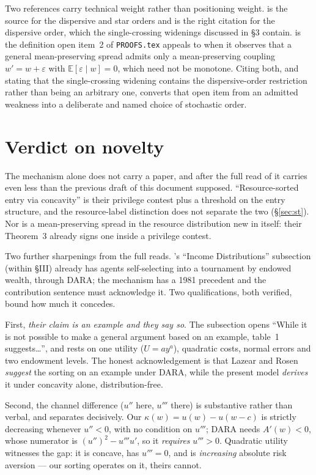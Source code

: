 \documentclass[11pt,a4paper]{article}
\begin{document}
Two references carry technical weight rather than positioning weight.
\citet{ShakedShanthikumar2007} is the source for the dispersive and star orders
and is the right citation for the dispersive order, which the single-crossing
widenings discussed in \S3 contain.
\citet{RothschildStiglitz1970} is the definition open item~2 of
\texttt{PROOFS.tex} appeals to when it observes that a general mean-preserving
spread admits only a mean-preserving coupling $w' = w + \varepsilon$ with
$\mathbb{E}[\varepsilon \mid w] = 0$, which need not be monotone. Citing both,
and stating that the single-crossing widening contains the dispersive-order
restriction rather than being an arbitrary one, converts that open item from an
admitted weakness into a deliberate and named choice of stochastic order.

\section{Verdict on novelty}

The mechanism alone does not carry a paper, and after the full read of
\citet{SchroyenTreich2016} it carries even less than the previous draft of this
document supposed. ``Resource-sorted entry via concavity'' is their privilege
contest plus a \citet{MorenoWooders2011} threshold on the entry structure, and
the resource-label distinction does not separate the two (\S\ref{sec:st}).
Nor is a mean-preserving spread in the resource distribution new in itself:
their Theorem~3 already signs one inside a privilege contest.

Two further sharpenings from the full reads. \citet{LazearRosen1981}'s
``Income Distributions'' subsection (within \S III) already has agents
self-selecting into a tournament by endowed wealth, through DARA; the mechanism
has a 1981 precedent and the contribution sentence must acknowledge it. Two
qualifications, both verified, bound how much it concedes.

First, \emph{their claim is an example and they say so}. The subsection opens
``While it is not possible to make a general argument based on an example,
table~1 suggests\ldots'', and rests on one utility ($U = ay^a$), quadratic
costs, normal errors and two endowment levels. The honest acknowledgement is
that Lazear and Rosen \emph{suggest} the sorting on an example under DARA,
while the present model \emph{derives} it under concavity alone,
distribution-free.

Second, the channel difference ($u''$ here, $u'''$ there) is substantive rather
than verbal, and separates decisively. Our $\kappa(w) = u(w)-u(w-c)$ is
strictly decreasing whenever $u'' < 0$, with no condition on $u'''$; DARA needs
$A'(w) < 0$, whose numerator is $(u'')^2 - u'''u'$, so it \emph{requires}
$u''' > 0$. Quadratic utility witnesses the gap: it is concave, has $u''' = 0$,
and is \emph{increasing} absolute risk aversion --- our sorting operates on it,
theirs cannot.
\end{document}
